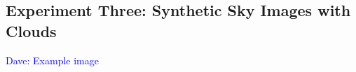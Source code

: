 \documentclass[11pt]{article}
\newcommand{\dnote}[1]{\textcolor{blue}{Dave: #1}}
\begin{document}
\begin{figure}
\begin{center}
\end{center}
\end{figure}

\subsection{Experiment Three: Synthetic Sky Images with Clouds}

\dnote{Example image}















\scriptsize{}
\end{document}
